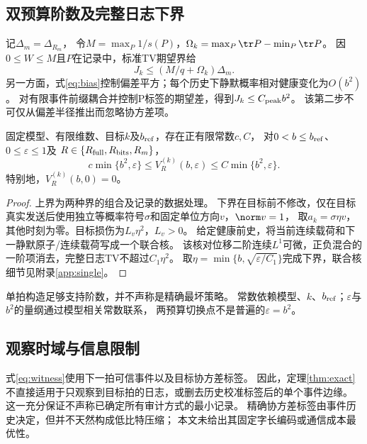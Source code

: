 \subsection{双预算阶数及完整日志下界}
记$\Delta_m=\Delta_{R_m}$，
令$M=\max_P1/s(P)$，$\Omega_k=\max_P\tr P-\min_P\tr P$。
因$0\le W\le M$且$P$在记录中，标准TV期望界给
\[
J_k\le(M/q+\Omega_k)\Delta_m.
\]
另一方面，式\eqref{eq:bias}控制偏差平方；每个历史下静默概率相对健康变化为$O(b^2)$。
对有限事件前缀耦合并控制P标签的期望差，得到$J_k\le C_{\rm peak}b^2$。
该第二步不可仅从偏差半径推出而忽略协方差项。

\begin{theorem}[精确反馈的有限时域损伤阶数]
\label{thm:exact}
固定模型、有限维数、目标$k$及$b_{\rm ref}$，存在正有限常数$c,C$，
对$0<b\le b_{\rm ref}$、$0\le\varepsilon\le1$及
$R\in\{R_{\rm full},R_{\rm bits},R_m\}$，
\begin{equation}
c\min\{b^2,\varepsilon\}\le V_R^{(k)}(b,\varepsilon)
\le C\min\{b^2,\varepsilon\}.
\label{eq:exact-bound}
\end{equation}
特别地，$V_R^{(k)}(b,0)=0$。
\end{theorem}
\begin{proof}
上界为两种界的组合及记录的数据处理。
下界在目标前不修改，仅在目标真实发送后使用独立等概率符号$\sigma$和固定单位方向$v$，$\norm v=1$，
取$a_k=\sigma\eta v$，其他时刻为零。目标损伤为$L_v\eta^2$，$L_v>0$。
给定健康前史，将当前连续载荷和下一静默原子/连续载荷写成一个联合核。
该核对位移二阶连续$L^1$可微，正负混合的一阶项消去，完整日志TV不超过$C_1\eta^2$。
取$\eta=\min\{b,\sqrt{\varepsilon/C_1}\}$完成下界，联合核细节见附录\ref{app:single}。
\end{proof}
单拍构造足够支持阶数，并不声称是精确最坏策略。
常数依赖模型、$k$、$b_{\rm ref}$；$\varepsilon$与$b^2$的量纲通过模型相关常数联系，
两预算切换点不是普遍的$\varepsilon=b^2$。

\subsection{观察时域与信息限制}
式\eqref{eq:witness}使用下一拍可信事件以及目标协方差标签。
因此，定理\ref{thm:exact}不直接适用于只观察到目标拍的日志，或删去历史校准标签后的单个事件边缘。
这一充分保证不声称已确定所有审计方式的最小记录。
精确协方差标签由事件历史决定，但并不天然构成低比特压缩；
本文未给出其固定字长编码或通信成本最优性。
